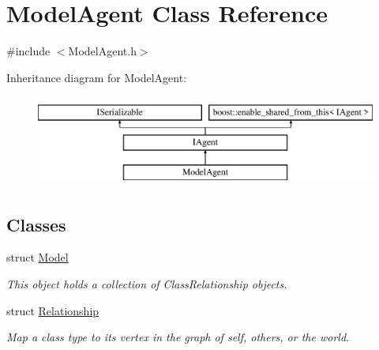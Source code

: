 \hypertarget{class_model_agent}{}\section{Model\+Agent Class Reference}
\label{class_model_agent}


{\ttfamily \#include $<$Model\+Agent.\+h$>$}

Inheritance diagram for Model\+Agent\+:\begin{figure}[H]
\begin{center}
\leavevmode
\includegraphics[height=3.000000cm]{class_model_agent}
\end{center}
\end{figure}
\subsection*{Classes}
\begin{DoxyCompactItemize}
\item 
struct \hyperlink{struct_model_agent_1_1_model}{Model}
\begin{DoxyCompactList}\small\item\em This object holds a collection of Class\+Relationship objects. \end{DoxyCompactList}\item 
struct \hyperlink{struct_model_agent_1_1_relationship}{Relationship}
\begin{DoxyCompactList}\small\item\em Map a class type to its vertex in the graph of self, others, or the world. \end{DoxyCompactList}\end{DoxyCompactItemize}
